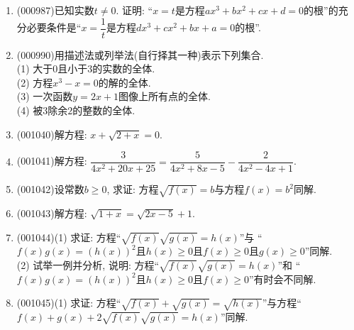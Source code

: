 \documentclass[10pt,a4paper]{article}
\newcommand{\blank}[1]{\underline{\hbox to #1pt{}}}
\begin{document}
\begin{enumerate}[1.]
\blank{30}(1) 所有直角三角形都不是等边三角形; / 所有直角三角形都是等边三角形.\\ 
\blank{30}(2) 对一切实数$x$, $x^2+1 \ne 0$; / 存在实数$x$, 使得$x^2+1=0$.\\ 
\blank{30}(3) 所有一元二次方程都没有实数根; / 有些一元二次方程没有实数根.\\ 
\blank{30}(4) 所有自然数都不是$0$; / 所有自然数都是$0$.\\ 
\blank{30}(5) 存在实数$x$, 使得$x^2-5x+6=0$; / 所有实数$x$, 都使得$x^2-5x+6\ne 0$.\\ 
\blank{30}(6) 对于一些实数$x$, $x^3+1=0$; / 对于一些实数$x$, $x^3+1\ne 0$.\\ 
\blank{30}(7) 有些三角形两边的平方和等于第三边的平方; / 所有三角形两边的平方和不等于第三边的平方.\\ 
\blank{30}(8) 对于某些实数$x$, $x=x+1$; / 对于任意实数$x$, $x \ne x+1$.\\ 
\blank{30}(9) 负实数没有平方根; / 负实数有平方根.
\item {\tiny (000987)}已知实数$t\ne 0$. 证明: ``$x=t$是方程$a x^3+b x^2+cx+d=0$的根''的充分必要条件是``$x=\dfrac{1}{t}$是方程$d x^3+c x^2+ b x+a=0$的根''.
\item {\tiny (000990)}用描述法或列举法(自行择其一种)表示下列集合.\\ 
(1) 大于$0$且小于$3$的实数的全体.\\ 
(2) 方程$x^3-x=0$的解的全体.\\ 
(3) 一次函数$y=2x+1$图像上所有点的全体.\\ 
(4) 被$3$除余$2$的整数的全体.
\item {\tiny (001040)}解方程: $x+\sqrt{2+x}=0$.
\item {\tiny (001041)}解方程: $\dfrac{3}{4x^2+20x+25}=\dfrac{5}{4x^2+8x-5}-\dfrac{2}{4x^2-4x+1}$.
\item {\tiny (001042)}设常数$b\geq 0$, 求证: 方程$\sqrt{f(x)}=b$与方程$f(x)=b^2$同解.
\item {\tiny (001043)}解方程: $\sqrt{1+x}=\sqrt{2x-5}+1$.
\item {\tiny (001044)}(1) 求证: 方程``$\sqrt{f(x)}\sqrt{g(x)}=h(x)$''与
``$f(x)g(x)=(h(x))^2$且$h(x)\geq 0$且$f(x)\geq 0$且$g(x)\geq 0$''同解.\\ 
(2) 试举一例并分析, 说明: 方程``$\sqrt{f(x)}\sqrt{g(x)}=h(x)$''和
``$f(x)g(x)=(h(x))^2$且$h(x)\geq 0$且$f(x)\geq 0$''有时会不同解.
\item {\tiny (001045)}(1) 求证: 方程``$\sqrt{f(x)}+\sqrt{g(x)}=\sqrt{h(x)}$''与方程``$f(x)+g(x)+2\sqrt{f(x)}\sqrt{g(x)}=h(x)$''同解.\\ 

\end{enumerate}
\end{document}
